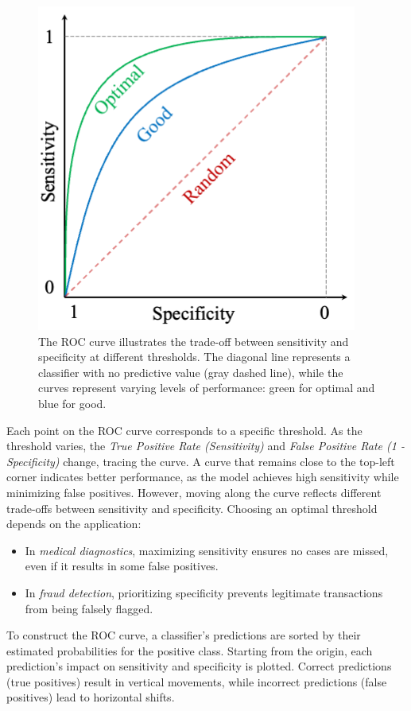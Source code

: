 \documentclass[
]{book}
\providecommand{\tightlist}{%
  \setlength{\itemsep}{0pt}\setlength{\parskip}{0pt}}
\theoremstyle{definition}
\theoremstyle{definition}
\theoremstyle{definition}
\theoremstyle{definition}
\theoremstyle{remark}
\begin{document}
\begin{figure}

{\centering \includegraphics[width=0.6\linewidth]{images/roc-curve} 

}

\caption{The ROC curve illustrates the trade-off between sensitivity and specificity at different thresholds. The diagonal line represents a classifier with no predictive value (gray dashed line), while the curves represent varying levels of performance: green for optimal and blue for good.}\label{fig:roc-curve}
\end{figure}

Each point on the ROC curve corresponds to a specific threshold. As the threshold varies, the \emph{True Positive Rate (Sensitivity)} and \emph{False Positive Rate (1 - Specificity)} change, tracing the curve. A curve that remains close to the top-left corner indicates better performance, as the model achieves high sensitivity while minimizing false positives. However, moving along the curve reflects different trade-offs between sensitivity and specificity. Choosing an optimal threshold depends on the application:

\begin{itemize}
\tightlist
\item
  In \emph{medical diagnostics}, maximizing sensitivity ensures no cases are missed, even if it results in some false positives.\\
\item
  In \emph{fraud detection}, prioritizing specificity prevents legitimate transactions from being falsely flagged.
\end{itemize}

To construct the ROC curve, a classifier's predictions are sorted by their estimated probabilities for the positive class. Starting from the origin, each prediction's impact on sensitivity and specificity is plotted. Correct predictions (true positives) result in vertical movements, while incorrect predictions (false positives) lead to horizontal shifts.
\end{document}

